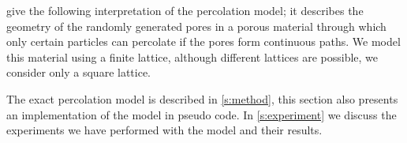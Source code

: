 \noindent \textcite{kenzel1997physics} give the following interpretation of the percolation model; it describes the geometry of the randomly generated pores in a porous material through which only certain particles can percolate if the pores form continuous paths. We model this material using a finite lattice, although different lattices are possible, we consider only a square lattice. 

The exact percolation model is described in \cref{s:method}, this section also presents an implementation of the model in pseudo code. In \cref{s:experiment} we discuss the experiments we have performed with the model and their results. 
